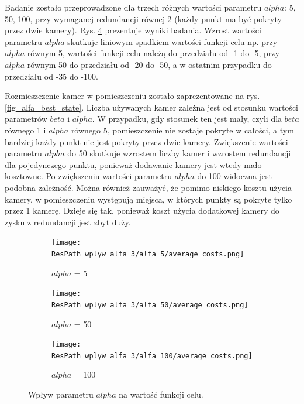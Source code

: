 \documentclass[12pt,a4paper]{article}
\newcommand{\ResPath}{../badania/}
\begin{document}
Badanie zostało przeprowadzone dla trzech różnych wartości parametru $alpha$: 5, 50, 100, przy wymaganej redundancji równej 2 (każdy punkt ma być pokryty przez dwie kamery).
Rys. \ref{fig_alfa} prezentuje wyniki badania. 
Wzrost wartości parametru $alpha$ skutkuje liniowym spadkiem wartości funkcji celu np. przy $alpha$ równym 5, wartości funkcji celu należą do przedziału od -1 do -5, przy $alpha$ równym 50 do przedziału od -20 do -50, a w ostatnim przypadku do przedziału od -35 do -100.

Rozmieszczenie kamer w pomieszczeniu zostało zaprezentowane na rys. \ref{fig_alfa_best_state}.
Liczba używanych kamer zależna jest od stosunku wartości parametrów $beta$ i $alpha$.
W przypadku, gdy stosunek ten jest mały, czyli dla $beta$ równego 1 i $alpha$ równego 5, pomieszczenie nie zostaje pokryte w całości, a tym bardziej każdy punkt nie jest
pokryty przez dwie kamery.
Zwiększenie wartości parametru $alpha$ do 50 skutkuje wzrostem liczby kamer
i wzrostem redundancji dla pojedynczego punktu, ponieważ dodawanie kamery jest
wtedy mało kosztowne.
Po zwiększeniu wartości parametru $alpha$ do 100 widoczna jest podobna zależność. Można również
zauważyć, że pomimo niskiego kosztu użycia kamery, w pomieszczeniu występują miejsca, w których punkty są pokryte tylko przez 1 kamerę. 
Dzieje się tak, ponieważ koszt użycia dodatkowej kamery do zysku z redundancji jest zbyt duży.

\begin{figure}[htb]
  \begin{subfigure}[b]{0.5\linewidth}
    \centering
    \texttt{[image: \\ResPath wplyw\_alfa\_3/alfa\_5/average\_costs.png]}
    \caption{$alpha$ = 5}
    \label{fig_alfa:a}
    \vspace{2ex}
  \end{subfigure}%
  \begin{subfigure}[b]{0.5\linewidth}
    \texttt{[image: \\ResPath wplyw\_alfa\_3/alfa\_50/average\_costs.png]}
    \caption{$alpha$ = 50}
    \label{fig_alfa:b}
    \vspace{2ex}
  \end{subfigure}
  \begin{subfigure}[b]{0.5\linewidth}
    \centering
    \texttt{[image: \\ResPath wplyw\_alfa\_3/alfa\_100/average\_costs.png]}
    \caption{$alpha$ = 100}
    \label{fig_alfa:c}
  \end{subfigure}%

  \caption{Wpływ parametru $alpha$ na wartość funkcji celu.}
  \label{fig_alfa}
\end{figure}
\restoregeometry
\end{document}
